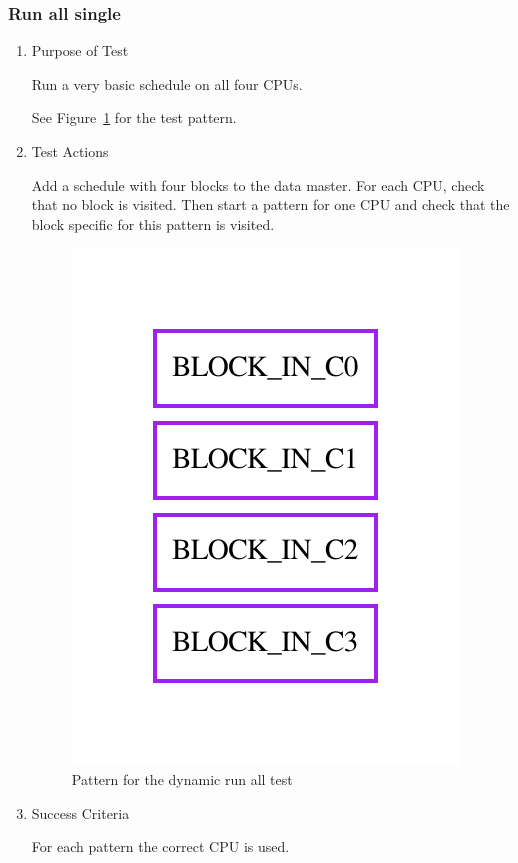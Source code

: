 \documentclass[12pt,a4paper]{report}
\begin{document}
\subsubsection{Run all single}
\begin{enumerate}
	\item Purpose of Test

    Run a very basic schedule on all four CPUs.

	See Figure~\ref{fig:Pattern_for_the_dynamic_run_all_test} for the test pattern.
	\item Test Actions

	Add a schedule with four blocks to the data master. For each CPU, check that no block is visited. Then start 
	a pattern for one CPU and check that the block specific for this pattern is visited.
    \begin{figure}
        \centering 
        \includegraphics{TestPattern/dynamic_basic_run_all_single.pdf}
        \caption{Pattern for the dynamic run all test}
        \label{fig:Pattern_for_the_dynamic_run_all_test}
    \end{figure}
	\item Success Criteria

	For each pattern the correct CPU is used.
\end{enumerate}
\end{document}
